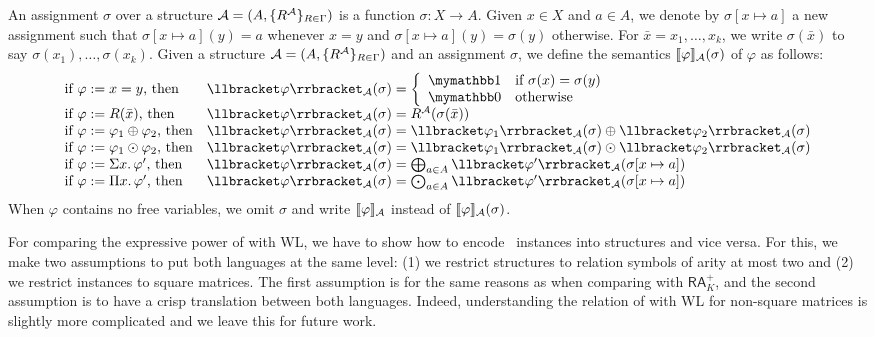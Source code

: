 An assignment $\sigma$ over a structure $\mathcal{A} = (A, \{R^{\mathcal{A}}\}_{R \in \Gamma})$ is a function $\sigma: X \rightarrow A$. Given $x \in X$ and $a \in A$, we denote by $\sigma[x \mapsto a]$ a new assignment such that $\sigma[x \mapsto a](y) = a$ whenever $x = y$ and $\sigma[x \mapsto a](y) = \sigma(y)$ otherwise. For $\bar{x} = x_1, \ldots, x_k$,  we write $\sigma(\bar{x})$ to say $\sigma(x_1),\ldots, \sigma(x_k)$. Given a structure $\mathcal{A} = (A, \{R^{\mathcal{A}}\}_{R \in \Gamma})$ and an assignment $\sigma$, we define the semantics $\llbracket \varphi \rrbracket_{\mathcal{A}}(\sigma)$ of $\varphi$ as follows:
$$
\begin{array}{ll}
\text{if $\varphi := x = y$, then} & \ssem{\varphi}{\cA}(\sigma) = 
\left\{
\begin{array}{ll}
\kone & \text{if $\sigma(x) = \sigma(y)$} \\
\kzero & \text{otherwise}
\end{array}
\right. \\
\text{if $\varphi := R(\bar{x})$, then} & \ssem{\varphi}{\cA}(\sigma) = R^\cA(\sigma(\bar{x})) \\
\text{if $\varphi := \varphi_1 \ksum \varphi_2$, then} & \ssem{\varphi}{\cA}(\sigma) = \ssem{\varphi_1}{\cA}(\sigma) \ksum \ssem{\varphi_2}{\cA}(\sigma)  \\
\text{if $\varphi := \varphi_1 \kprod \varphi_2$, then} & \ssem{\varphi}{\cA}(\sigma) = \ssem{\varphi_1}{\cA}(\sigma) \kprod \ssem{\varphi_2}{\cA}(\sigma)  \\
\text{if $\varphi := \Sigma x. \, \varphi'$, then} & \ssem{\varphi}{\cA}(\sigma) =  \bigksum_{a \in A} \ssem{\varphi'}{\cA}(\sigma[x \mapsto a]) \\
\text{if $\varphi := \Pi x. \, \varphi'$, then} & \ssem{\varphi}{\cA}(\sigma) =  \bigkprod_{a \in A} \ssem{\varphi'}{\cA}(\sigma[x \mapsto a])
\end{array}
$$
When $\varphi$ contains no free variables, we omit $\sigma$ and write $\llbracket \varphi \rrbracket_{\mathcal{A}}$ instead of $\llbracket \varphi \rrbracket_{\mathcal{A}}(\sigma)$.

For comparing the expressive power of \langprod with WL, we have to show how to encode \lang\ instances into structures and vice versa. For this, we make two assumptions to put both languages at the same level: (1) we restrict structures to relation symbols of arity at most two and (2) we restrict instances to square matrices. The first assumption is for the same reasons as when comparing \langsum with $\mathsf{RA}_K^+$, and the second assumption is to have a crisp translation between both languages. Indeed, understanding the relation of \langprod with WL for non-square matrices is slightly more complicated and we leave this for future work. 

